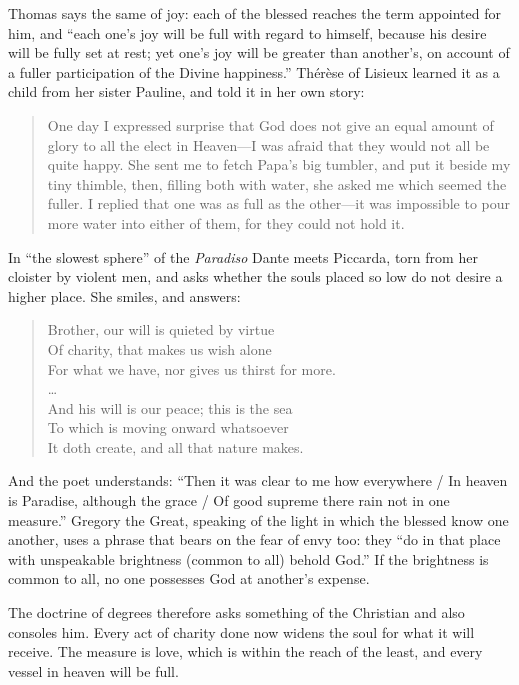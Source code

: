 Thomas says the same of joy: each of the blessed reaches the term appointed for him, and ``each one's joy will be full with regard to himself, because his desire will be fully set at rest; yet one's joy will be greater than another's, on account of a fuller participation of the Divine happiness.'' Thérèse of Lisieux learned it as a child from her sister Pauline, and told it in her own story:

\begin{quote}
One day I expressed surprise that God does not give an equal amount of glory to all the elect in Heaven---I was afraid that they would not all be quite happy. She sent me to fetch Papa's big tumbler, and put it beside my tiny thimble, then, filling both with water, she asked me which seemed the fuller. I replied that one was as full as the other---it was impossible to pour more water into either of them, for they could not hold it.
\end{quote}

In ``the slowest sphere'' of the \emph{Paradiso} Dante meets Piccarda, torn from her cloister by violent men, and asks whether the souls placed so low do not desire a higher place. She smiles, and answers:

\begin{quote}
Brother, our will is quieted by virtue\\
\quad Of charity, that makes us wish alone\\
\quad For what we have, nor gives us thirst for more.\\
\ldots\\
And his will is our peace; this is the sea\\
\quad To which is moving onward whatsoever\\
\quad It doth create, and all that nature makes.
\end{quote}

And the poet understands: ``Then it was clear to me how everywhere / In heaven is Paradise, although the grace / Of good supreme there rain not in one measure.'' Gregory the Great, speaking of the light in which the blessed know one another, uses a phrase that bears on the fear of envy too: they ``do in that place with unspeakable brightness (common to all) behold God.'' If the brightness is common to all, no one possesses God at another's expense.

The doctrine of degrees therefore asks something of the Christian and also consoles him. Every act of charity done now widens the soul for what it will receive. The measure is love, which is within the reach of the least, and every vessel in heaven will be full.

